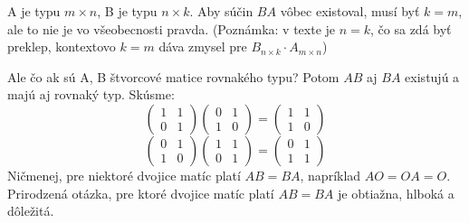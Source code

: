 \documentclass[12pt, a4paper]{article}
\theoremstyle{definition}
\begin{document}
A je typu $m \times n$, B je typu $n \times k$.
Aby súčin $B A$ vôbec existoval, musí byť $k = m$, ale to nie je vo všeobecnosti pravda.
(Poznámka: v texte je $n=k$, čo sa zdá byť preklep, kontextovo $k=m$ dáva zmysel pre $B_{n \times k} \cdot A_{m \times n}$)

Ale čo ak sú A, B štvorcové matice rovnakého typu? Potom $AB$ aj $BA$ existujú a majú aj rovnaký typ.
Skúsme:
\[ \begin{pmatrix} 1 & 1 \\ 0 & 1 \end{pmatrix} \begin{pmatrix} 0 & 1 \\ 1 & 0 \end{pmatrix} = \begin{pmatrix} 1 & 1 \\ 1 & 0 \end{pmatrix} \]
\[ \begin{pmatrix} 0 & 1 \\ 1 & 0 \end{pmatrix} \begin{pmatrix} 1 & 1 \\ 0 & 1 \end{pmatrix} = \begin{pmatrix} 0 & 1 \\ 1 & 1 \end{pmatrix} \]
Ničmenej, pre niektoré dvojice matíc platí $AB = BA$, napríklad $A O = O A = O$.
Prirodzená otázka, pre ktoré dvojice matíc platí $AB = BA$ je obtiažna, hlboká a dôležitá.
\end{document}
